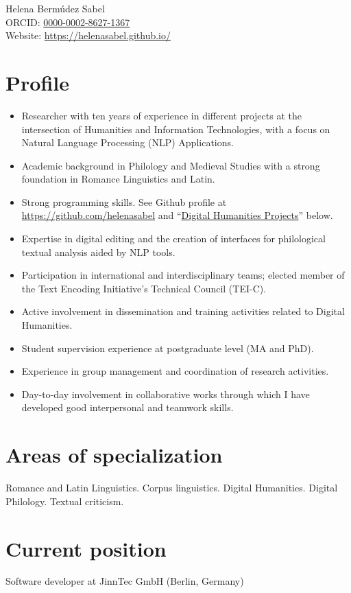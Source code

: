 \documentclass[11pt, a4paper]{article}
\newcommand{\years}[1]{\marginnote{\scriptsize #1}}
\begin{document}
{\LARGE Helena Bermúdez Sabel}\\[1cm]
ORCID: \href{https://orcid.org/0000-0002-8627-1367}{0000-0002-8627-1367}\\
Website: \url{https://helenasabel.github.io/} 



\section{Profile}
\begin{itemize}[noitemsep]
 \item Researcher with ten years of experience in different projects at the intersection of Humanities and Information Technologies, with a focus on Natural Language Processing (NLP) Applications.
 \item Academic background in Philology and Medieval Studies with a strong foundation in Romance Linguistics and Latin.
 \item Strong programming skills. See Github profile at \url{https://github.com/helenasabel} and  “\hyperref[DHprojects]{Digital Humanities Projects}” below.
 \item Expertise in digital editing and the creation of interfaces for philological textual analysis aided by NLP tools.
 \item Participation in international and interdisciplinary teams; elected member of the Text Encoding Initiative's Technical Council (TEI-C).
 \item Active involvement in dissemination and training activities related to Digital Humanities.
 \item Student supervision experience at postgraduate level (MA and PhD).
\item Experience in group management and coordination of research activities.
\item Day-to-day involvement in collaborative works through which I have developed good interpersonal and teamwork skills.
\end{itemize}


\section{Areas of specialization}
Romance and Latin Linguistics. Corpus linguistics. Digital Humanities. Digital Philology. Textual criticism.

\section{Current position}
\years{08/2023--}Software developer at JinnTec GmbH (Berlin, Germany)
\end{document}
